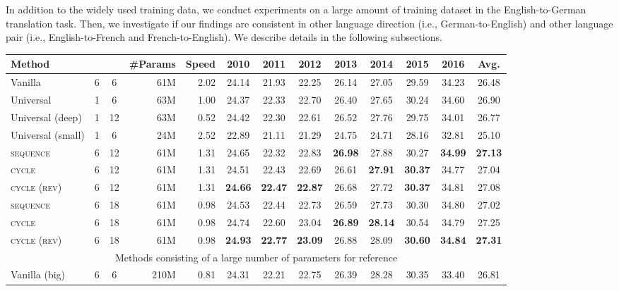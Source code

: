 \documentclass[11pt]{article}
\begin{document}
In addition to the widely used training data, we conduct experiments on a large amount of training dataset in the English-to-German translation task.
Then, we investigate if our findings are consistent in other language direction (i.e., German-to-English) and other language pair (i.e., English-to-French and French-to-English).
We describe details in the following subsections.


\begin{table*}[!t]
  \centering{}
  \footnotesize
  \begin{tabular}{ l | c c | r | r | c c c c c c c | c} \hline
  Method &  &  & \multicolumn{1}{c|}{\#Params} & Speed & 2010 & 2011 & 2012 & 2013 & 2014 & 2015 & 2016 & Avg. \\ \hline \hline
  Vanilla & 6 & 6 & 61M & 2.02 & 24.14 & 21.93 & 22.25 & 26.14 & 27.05 & 29.59 & 34.23 & 26.48 \\
  Universal & 1 & 6 & 63M & 1.00 & 24.37 & 22.33 & 22.70 & 26.40 & 27.65 & 30.24 & 34.60 & 26.90 \\
  Universal (deep) & 1 & 12 & 63M & 0.52 & 24.42 & 22.30 & 22.61 & 26.52 & 27.76 & 29.75 & 34.01 & 26.77 \\
  Universal (small) & 1 & 6 & 24M & 2.52 & 22.89 & 21.11 & 21.29 & 24.75 & 24.71 & 28.16 & 32.81 & 25.10 \\
  \textsc{sequence} & 6 & 12 & 61M & 1.31 & 24.65 & 22.32 & 22.83 & \textbf{26.98} & 27.88 & 30.27 & \textbf{34.99} & \textbf{27.13} \\  
  \textsc{cycle} & 6 & 12 & 61M & 1.31 & 24.51 & 22.43 & 22.69 & 26.61 & \textbf{27.91} & \textbf{30.37} & 34.77 & 27.04 \\
  \textsc{cycle (rev)} & 6 & 12 & 61M & 1.31 & \textbf{24.66} & \textbf{22.47} & \textbf{22.87} & 26.68 & 27.72 & \textbf{30.37} & 34.81 & 27.08 \\ \hline
  \textsc{sequence} & 6 & 18 & 61M & 0.98 & 24.53 & 22.44 & 22.73 & 26.59 & 27.73 & 30.30 & 34.80 & 27.02 \\
  \textsc{cycle} & 6 & 18 & 61M & 0.98 & 24.74 & 22.60 & 23.04 & \textbf{26.89} & \textbf{28.14} & 30.54 & 34.79 & 27.25 \\
  \textsc{cycle (rev)} & 6 & 18 & 61M & 0.98 & \textbf{24.93} & \textbf{22.77} & \textbf{23.09} & 26.88 & 28.09 & \textbf{30.60} & \textbf{34.84} & \textbf{27.31} \\ \hline \hline
  \multicolumn{13}{c}{Methods consisting of a large number of parameters for reference} \\ \hline \hline
  Vanilla (big) & 6 & 6 & 210M & 0.81 & 24.31 & 22.21 & 22.75 & 26.39 & 28.28 & 30.35 & 33.40 & 26.81 \\

\end{tabular}
\end{table*}
\end{document}
